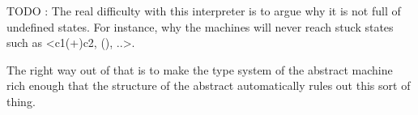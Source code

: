 \documentclass{llncs}
\begin{document}
%





TODO : The real difficulty with this interpreter is to argue why it is
not full of undefined states. For instance, why the machines will
never reach stuck states such as {{<c1(+)c2, (), ..>}}.

The right way out of that is to make the type system of the abstract
machine rich enough that the structure of the abstract automatically
rules out this sort of thing. 








 

\end{document}
